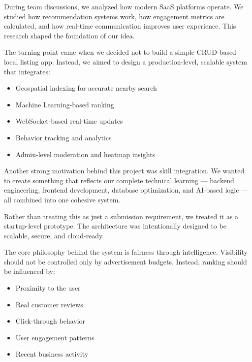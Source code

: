 \documentclass[12pt,a4paper]{report}
\begin{document}
During team discussions, we analyzed how modern SaaS platforms operate. We studied how recommendation systems work, how engagement metrics are calculated, and how real-time communication improves user experience. This research shaped the foundation of our idea.

The turning point came when we decided not to build a simple CRUD-based local listing app. Instead, we aimed to design a production-level, scalable system that integrates:

\begin{itemize}

\item Geospatial indexing for accurate nearby search

\item Machine Learning-based ranking

\item WebSocket-based real-time updates

\item Behavior tracking and analytics

\item Admin-level moderation and heatmap insights

\end{itemize}

Another strong motivation behind this project was skill integration. We wanted to create something that reflects our complete technical learning — backend engineering, frontend development, database optimization, and AI-based logic — all combined into one cohesive system.

Rather than treating this as just a submission requirement, we treated it as a startup-level prototype. The architecture was intentionally designed to be scalable, secure, and cloud-ready.

The core philosophy behind the system is fairness through intelligence. Visibility should not be controlled only by advertisement budgets. Instead, ranking should be influenced by:

\begin{itemize}

\item Proximity to the user

\item Real customer reviews

\item Click-through behavior

\item User engagement patterns

\item Recent business activity

\end{itemize}
\end{document}
